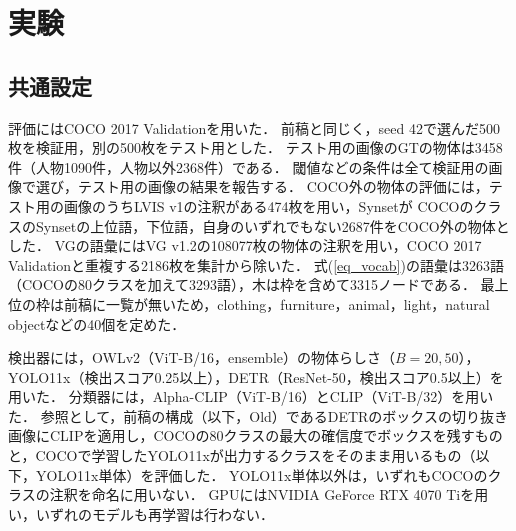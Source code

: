 \section{実験}
\subsection{共通設定}
評価にはCOCO 2017 Validationを用いた．
前稿\cite{ref_prev}と同じく，seed 42で選んだ500枚を検証用，別の500枚をテスト用とした．
テスト用の画像のGTの物体は3458件（人物1090件，人物以外2368件）である．
閾値などの条件は全て検証用の画像で選び，テスト用の画像の結果を報告する．
COCO外の物体の評価には，テスト用の画像のうちLVIS v1\cite{ref_LVIS}の注釈がある474枚を用い，Synsetが COCOのクラスのSynsetの上位語，下位語，自身のいずれでもない2687件をCOCO外の物体とした．
VGの語彙にはVG v1.2の108077枚の物体の注釈を用い，COCO 2017 Validationと重複する2186枚を集計から除いた．
式(\ref{eq_vocab})の語彙は3263語（COCOの80クラスを加えて3293語），木は枠を含めて3315ノードである．
最上位の枠は前稿に一覧が無いため，clothing，furniture，animal，light，natural objectなどの40個を定めた．

検出器には，OWLv2（ViT-B/16，ensemble）\cite{ref_OWLv2}の物体らしさ（$ B = 20, 50 $），YOLO11x\cite{ref_YOLO11}（検出スコア0.25以上），DETR（ResNet-50，検出スコア0.5以上）\cite{ref_DETR}を用いた．
分類器には，Alpha-CLIP（ViT-B/16）\cite{ref_AlphaCLIP}とCLIP（ViT-B/32）\cite{ref_CLIP}を用いた．
参照として，前稿の構成（以下，Old）であるDETRのボックスの切り抜き画像にCLIPを適用し，COCOの80クラスの最大の確信度でボックスを残すものと，COCOで学習したYOLO11xが出力するクラスをそのまま用いるもの（以下，YOLO11x単体）を評価した．
YOLO11x単体以外は，いずれもCOCOのクラスの注釈を命名に用いない．
GPUにはNVIDIA GeForce RTX 4070 Tiを用い，いずれのモデルも再学習は行わない．

